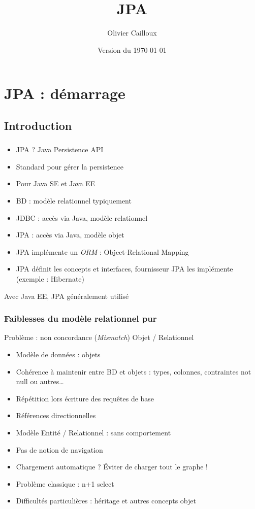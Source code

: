 \documentclass[english, french]{beamer}
\title{JPA}
\author{Olivier Cailloux}
\institute[LAMSADE]{LAMSADE, Université Paris-Dauphine}
\date{Version du \today}
\begin{document}


\begin{frame}[plain]
   \titlepage
\end{frame}
\addtocounter{framenumber}{-1}

\section{JPA : démarrage}
\subsection{Introduction}
\begin{frame}
	\frametitle{\subsecname}
	\begin{itemize}
		\item JPA ? \pause Java Persistence API
		\item Standard pour gérer la persistence
		\item Pour Java SE et Java EE
		\item BD : modèle relationnel {\tiny typiquement}
		\item JDBC : accès via Java, modèle relationnel
		\item JPA : accès via Java, modèle objet
		\item JPA implémente un \emph{ORM} : Object-Relational Mapping
		\item JPA définit les concepts et interfaces, fournisseur JPA les implémente (exemple : Hibernate)
	\end{itemize}
	 Avec Java EE, JPA généralement utilisé
\end{frame}

\begin{frame}
	\frametitle{Faiblesses du modèle relationnel pur}
	Problème : non concordance (\emph{Mismatch}) Objet / Relationnel
	\begin{itemize}
		\item Modèle de données : objets
		\item Cohérence à maintenir entre BD et objets : types, colonnes, contraintes not null ou autres…
		\item Répétition lors écriture des requêtes de base
		\item Références directionnelles
		\item Modèle Entité / Relationnel : sans comportement
		\item Pas de notion de navigation
		\item Chargement automatique ? \pause Éviter de charger tout le graphe !\pause
		\item Problème classique : n+1 select
		\item Difficultés particulières : héritage et autres concepts objet
	\end{itemize}
\end{frame}
\end{document}
